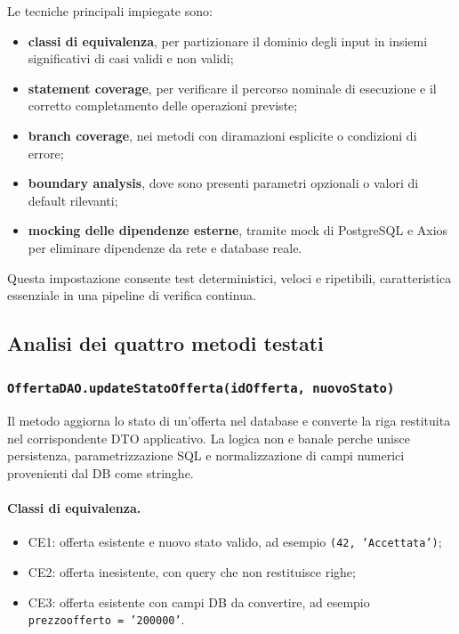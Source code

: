 \documentclass[a4paper,11pt]{article}
\begin{document}
Le tecniche principali impiegate sono:
\begin{itemize}
  \item \textbf{classi di equivalenza}, per partizionare il dominio degli input in insiemi significativi di casi validi e non validi;
  \item \textbf{statement coverage}, per verificare il percorso nominale di esecuzione e il corretto completamento delle operazioni previste;
  \item \textbf{branch coverage}, nei metodi con diramazioni esplicite o condizioni di errore;
  \item \textbf{boundary analysis}, dove sono presenti parametri opzionali o valori di default rilevanti;
  \item \textbf{mocking delle dipendenze esterne}, tramite mock di PostgreSQL e Axios per eliminare dipendenze da rete e database reale.
\end{itemize}

Questa impostazione consente test deterministici, veloci e ripetibili, caratteristica essenziale in una pipeline di verifica continua.

\subsection{Analisi dei quattro metodi testati}

\subsubsection{\texttt{OffertaDAO.updateStatoOfferta(idOfferta, nuovoStato)}}
Il metodo aggiorna lo stato di un'offerta nel database e converte la riga restituita nel corrispondente DTO applicativo. La logica non e banale perche unisce persistenza, parametrizzazione SQL e normalizzazione di campi numerici provenienti dal DB come stringhe.

\paragraph{Classi di equivalenza.}
\begin{itemize}
  \item CE1: offerta esistente e nuovo stato valido, ad esempio \texttt{(42, 'Accettata')};
  \item CE2: offerta inesistente, con query che non restituisce righe;
  \item CE3: offerta esistente con campi DB da convertire, ad esempio \texttt{prezzoofferto = '200000'}.
\end{itemize}
\end{document}
